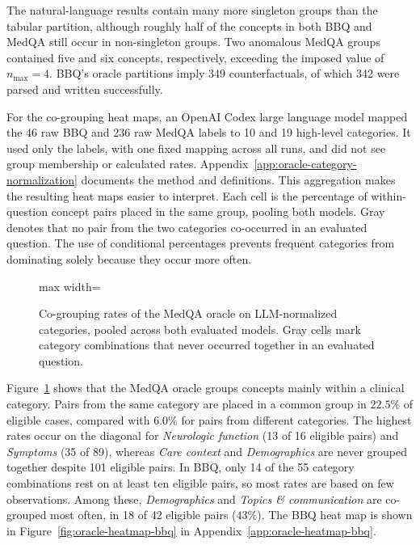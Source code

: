 The natural-language results contain many more singleton groups than the tabular partition, although roughly half of the concepts in both BBQ and MedQA still occur in non-singleton groups. Two anomalous MedQA groups contained five and six concepts, respectively, exceeding the imposed value of $n_{\max}=4$. BBQ's oracle partitions imply 349 counterfactuals, of which 342 were parsed and written successfully.

For the co-grouping heat maps, an OpenAI Codex large language model mapped the 46 raw BBQ and 236 raw MedQA labels to 10 and 19 high-level categories. It used only the labels, with one fixed mapping across all runs, and did not see group membership or calculated rates. Appendix~\ref{app:oracle-category-normalization} documents the method and definitions. This aggregation makes the resulting heat maps easier to interpret. Each cell is the percentage of within-question concept pairs placed in the same group, pooling both models. Gray denotes that no pair from the two categories co-occurred in an evaluated question. The use of conditional percentages prevents frequent categories from dominating solely because they occur more often.

\begin{figure}[htb]
  \centering
  \begin{adjustbox}{max width=\textwidth}
    \OracleHeatmapMedQA
  \end{adjustbox}
  \caption[Oracle co-grouping rates for MedQA]{Co-grouping rates of the MedQA oracle on LLM-normalized categories, pooled across both evaluated models. Gray cells mark category combinations that never occurred together in an evaluated question.}
  \label{fig:oracle-heatmap-medqa}
\end{figure}

Figure~\ref{fig:oracle-heatmap-medqa} shows that the MedQA oracle groups concepts mainly within a clinical category. Pairs from the same category are placed in a common group in $22.5\%$ of eligible cases, compared with $6.0\%$ for pairs from different categories. The highest rates occur on the diagonal for \textit{Neurologic function} (13 of 16 eligible pairs) and \textit{Symptoms} (35 of 89), whereas \textit{Care context} and \textit{Demographics} are never grouped together despite 101 eligible pairs. In BBQ, only 14 of the 55 category combinations rest on at least ten eligible pairs, so most rates are based on few observations. Among these, \textit{Demographics} and \textit{Topics \& communication} are co-grouped most often, in 18 of 42 eligible pairs ($43\%$). The BBQ heat map is shown in Figure~\ref{fig:oracle-heatmap-bbq} in Appendix~\ref{app:oracle-heatmap-bbq}.

